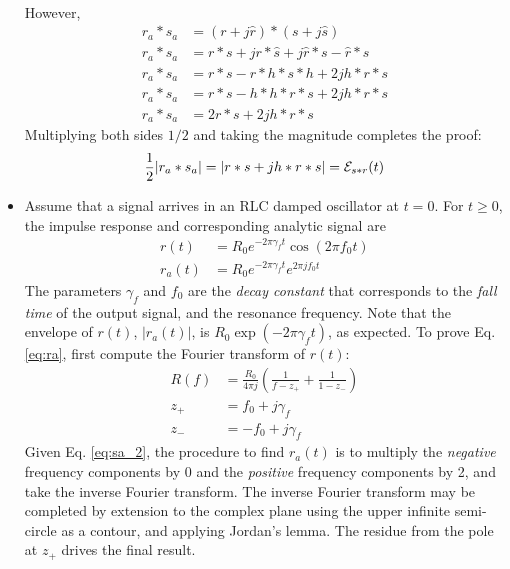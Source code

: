 \documentclass[amsmath,amssymb,aps,prd,10pt,twocolumn,showkeys]{revtex4}
\begin{document}
\begin{itemize}
\begin{align}
\end{align}
However,
\begin{align}
r_a * s_a &= (r + j \hat{r}) * (s + j \hat{s}) \\
r_a * s_a &= r * s + j r * \hat{s} + j \hat{r} * s - \hat{r} * \hat{s} \\
r_a * s_a &= r * s - r * h * s * h + 2 j h * r * s \\
r_a * s_a &= r * s - h * h * r * s + 2 j h * r * s \\
r_a * s_a &= 2 r * s + 2 j h * r * s
\end{align}
Multiplying both sides $1/2$ and taking the magnitude completes the proof:
\begin{equation}
\frac{1}{2} |r_a * s_a| = |r * s + j h * r * s| = \mathcal{E}_{s * r}(t) \\
\end{equation}
\item Assume that a signal arrives in an RLC damped oscillator at $t=0$.  For $t\geq 0$, the impulse response and corresponding analytic signal are
\begin{align}
r(t) &= R_0 e^{-2 \pi \gamma_f t} \cos(2\pi f_0 t) \label{eq:r} \\
r_a(t) &= R_0 e^{-2 \pi \gamma_f t} e^{2\pi j f_0 t} \label{eq:ra}
\end{align}
The parameters $\gamma_f$ and $f_0$ are the \textit{decay constant} that corresponds to the \textit{fall time} of the output signal, and the resonance frequency.  Note that the envelope of $r(t)$, $|r_a(t)|$, is $R_0 \exp(-2 \pi \gamma_f t)$, as expected.  To prove Eq. \ref{eq:ra}, first compute the Fourier transform of $r(t)$:
\begin{align}
R(f) &= \frac{R_0}{4\pi j} \left( \frac{1}{f - z_{+}} + \frac{1}{1- z_{-}} \right) \\
z_{+} &= f_0 + j \gamma_f \\
z_{-} &= -f_0 + j \gamma_f
\end{align}
Given Eq. \ref{eq:sa_2}, the procedure to find $r_a(t)$ is to multiply the \textit{negative} frequency components by 0 and the \textit{positive} frequency components by 2, and take the inverse Fourier transform.  The inverse Fourier transform may be completed by extension to the complex plane using the upper infinite semi-circle as a contour, and applying Jordan's lemma.  The residue from the pole at $z_{+}$ drives the final result.

\end{itemize}
\end{document}
